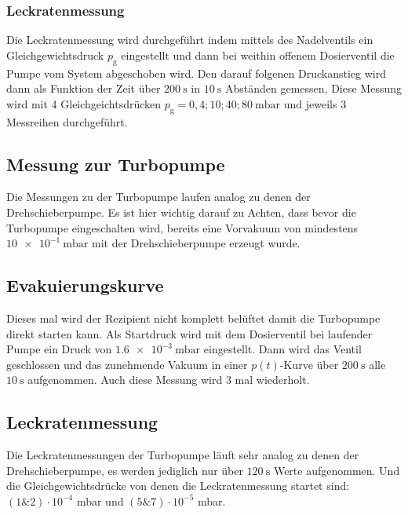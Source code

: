 		\subsubsection{Leckratenmessung}

		 	Die Leckratenmessung wird durchgeführt indem mittels des Nadelventils ein Gleichgewichtsdruck $p_\text{g}$ eingestellt und dann bei weithin offenem Dosierventil die Pumpe vom System abgeschoben wird.
			Den darauf folgenen Druckanstieg wird dann als Funktion der Zeit über $\SI{200}{\second}$ in $\SI{10}{\second}$ Abständen gemessen, 
			Diese Messung wird mit 4 Gleichgeichtsdrücken $p_\text{g} = 0,4; 10; 40; \SI{80}{\milli\bar}$ und jeweils 3 Messreihen durchgeführt.

	\subsection{Messung zur Turbopumpe}

		Die Messungen zu der Turbopumpe laufen analog zu denen der Drehschieberpumpe. 
		Es ist hier wichtig darauf zu Achten, dass bevor die Turbopumpe eingeschalten wird, bereits eine Vorvakuum von mindestens $\SI{10e-1}{\milli\bar}$ mit der Drehschieberpumpe erzeugt wurde.
		
		\subsection{Evakuierungskurve}

			Dieses mal wird der Rezipient nicht komplett belüftet damit die Turbopumpe direkt starten kann. 
			Als Startdruck  wird mit dem Dosierventil bei laufender Pumpe ein Druck von $\SI{1.6e-3}{\milli\bar}$ eingestellt.
			Dann wird das Ventil geschlossen und das zunehmende Vakuum in einer $p(t)$-Kurve über $\SI{200}{\second}$ alle $\SI{10}{\second}$ aufgenommen.
			Auch diese Messung wird 3 mal wiederholt.

		\subsection{Leckratenmessung}

			Die Leckratenmessungen der Turbopumpe läuft sehr analog zu denen der Drehschieberpumpe, es werden jediglich nur über $\SI{120}{\second}$ Werte aufgenommen. 
			Und die Gleichgewichtsdrücke von denen die Leckratenmessung startet sind: $(1 \& 2)\cdot10^{-4}$ mbar und $(5 \& 7)\cdot10^{-5}$ mbar.
